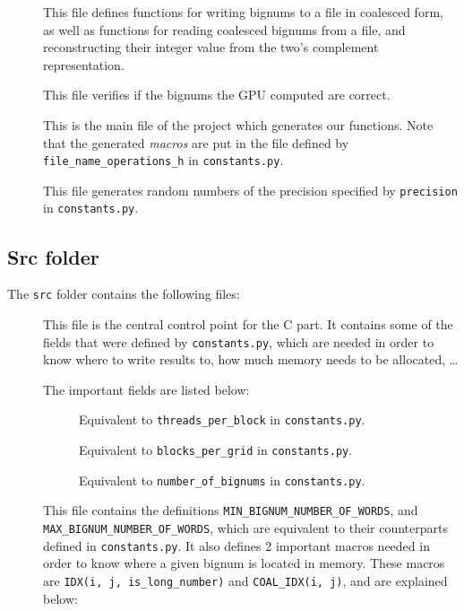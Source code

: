 \documentclass[12pt, a4paper]{report}
\begin{document}
\begin{sloppypar}
\begin{description}
\item[]
This file defines functions for writing bignums to a file in coalesced form, as
well as functions for reading coalesced bignums from a file, and reconstructing
their integer value from the two's complement representation.

\item[]
This file verifies if the bignums the GPU computed are correct.

\item[]
This is the main file of the project which generates our functions.
Note that the generated \emph{macros} are put in the file defined by
\verb+file_name_operations_h+ in \verb+constants.py+.

\item[]
This file generates random numbers of the precision specified by
\verb+precision+ in \verb+constants.py+.
\end{description}

\subsection{Src folder}
The \verb+src+ folder contains the following files:

\begin{description}
\item[]
This file is the central control point for the C part.
It contains some of the fields that were defined by \verb+constants.py+, which
are needed in order to know where to write results to, how much memory needs to
be allocated, \ldots

The important fields are listed below:

\begin{description}
\item[] Equivalent to \verb+threads_per_block+ in
\verb+constants.py+.
\item[] Equivalent to \verb+blocks_per_grid+ in
\verb+constants.py+.
\item[] Equivalent to \verb+number_of_bignums+ in
\verb+constants.py+.
\end{description}

\item[]
This file contains the definitions \verb+MIN_BIGNUM_NUMBER_OF_WORDS+, and
\verb+MAX_BIGNUM_NUMBER_OF_WORDS+, which are equivalent to their counterparts defined
in \verb+constants.py+.
It also defines 2 important macros needed in order to know where a given bignum
is located in memory.
These macros are \verb+IDX(i, j, is_long_number)+ and \verb+COAL_IDX(i, j)+, and
are explained below:


\end{description}
\end{sloppypar}
\end{document}
